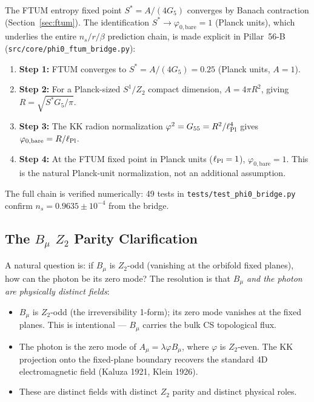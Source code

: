 \documentclass[12pt,a4paper]{article}
\begin{document}
The FTUM entropy fixed point $S^* = A/(4G_5)$ converges by Banach contraction
(Section~\ref{sec:ftum}).  The identification $S^* \to \varphi_{0,\text{bare}} = 1$
(Planck units), which underlies the entire $n_s/r/\beta$ prediction chain, is made
explicit in Pillar~56-B (\texttt{src/core/phi0\_ftum\_bridge.py}):
\begin{enumerate}
  \item \textbf{Step 1:} FTUM converges to $S^* = A/(4G_5) = 0.25$ (Planck units, $A=1$).
  \item \textbf{Step 2:} For a Planck-sized $S^1/Z_2$ compact dimension, $A = 4\pi R^2$,
        giving $R = \sqrt{S^* G_5 / \pi}$.
  \item \textbf{Step 3:} The KK radion normalization $\varphi^2 = G_{55} = R^2/\ell_{\rm Pl}^4$
        gives $\varphi_{0,\text{bare}} = R/\ell_{\rm Pl}$.
  \item \textbf{Step 4:} At the FTUM fixed point in Planck units ($\ell_{\rm Pl} = 1$),
        $\varphi_{0,\text{bare}} = 1$.  This is the natural Planck-unit normalization, not
        an additional assumption.
\end{enumerate}
The full chain is verified numerically: 49 tests in \texttt{tests/test\_phi0\_bridge.py}
confirm $n_s = 0.9635 \pm 10^{-4}$ from the bridge.

\subsection*{The \texorpdfstring{$B_\mu$}{Bmu} \texorpdfstring{$Z_2$}{Z2} Parity Clarification}

A natural question is: if $B_\mu$ is $Z_2$-odd (vanishing at the orbifold fixed planes),
how can the photon be its zero mode?  The resolution is that \emph{$B_\mu$ and the photon
are physically distinct fields}:
\begin{itemize}
  \item $B_\mu$ is $Z_2$-odd (the irreversibility 1-form); its zero mode vanishes at the
        fixed planes.  This is intentional — $B_\mu$ carries the bulk CS topological flux.
  \item The photon is the zero mode of $A_\mu = \lambda\varphi B_\mu$, where $\varphi$
        is $Z_2$-even.  The KK projection onto the fixed-plane boundary recovers the
        standard 4D electromagnetic field (Kaluza 1921, Klein 1926).
  \item These are distinct fields with distinct $Z_2$ parity and distinct physical roles.
\end{itemize}
\end{document}
